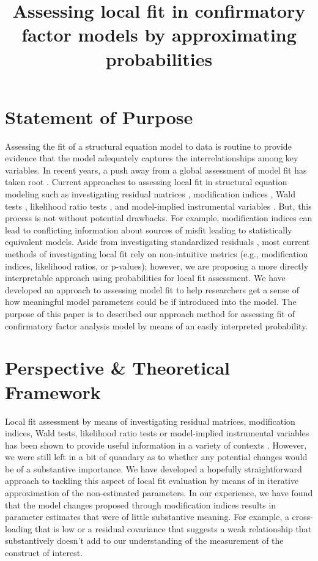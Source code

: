 \documentclass[man, noextraspace, floatsintext, 12pt]{apa7}
\title{Assessing local fit in confirmatory factor models by approximating probabilities}
\begin{document}
\maketitle

\section*{Statement of Purpose}

Assessing the fit of a structural equation model to data is routine to provide evidence that the model adequately captures the interrelationships among key variables.
In recent years, a push away from a global assessment of model fit has taken root \citep{Steiger2007, Jackson2009, Crede2019, Bollen2019}.
Current approaches to assessing local fit in structural equation modeling such as investigating residual matrices \citep{ Maydeu2017}, modification indices \citep{Sorbom1989}, Wald tests \citep{Wald1943, Buse1982}, likelihood ratio tests \citep{Neyman1928}, and model-implied instrumental variables \citep{Bollen1995, Bollen2019}.
But, this process is not without potential drawbacks.
For example, modification indices can lead to conflicting information about sources of misfit leading to statistically equivalent models.
Aside from investigating standardized residuals \citep{Maydeu2017}, most current methods of investigating local fit rely on non-intuitive metrics (e.g., modification indices, likelihood ratios, or p-values); however, we are proposing a more directly interpretable approach using probabilities for local fit assessment. 
We have developed an approach to assessing model fit to help researchers get a sense of how meaningful model parameters could be if introduced into the model.
The purpose of this paper is to described our approach method for assessing fit of confirmatory factor analysis model by means of an easily interpreted probability.


\section*{Perspective \& Theoretical Framework}

Local fit assessment by means of investigating residual matrices, modification indices, Wald tests, likelihood ratio tests or model-implied instrumental variables has been shown to provide useful information in a variety of contexts \citep{Whittaker2012, Maydeu2017}.
However, we were still left in a bit of quandary as to whether any potential changes would be of a substantive importance.
We have developed a hopefully straightforward approach to tackling this aspect of local fit evaluation by means of in iterative approximation of the non-estimated parameters.
In our experience, we have found that the model changes proposed through modification indices results in parameter estimates that were of little substantive meaning.
For example, a cross-loading that is low or a residual covariance that suggests a weak relationship that substantively doesn't add to our understanding of the measurement of the construct of interest.
\end{document}
